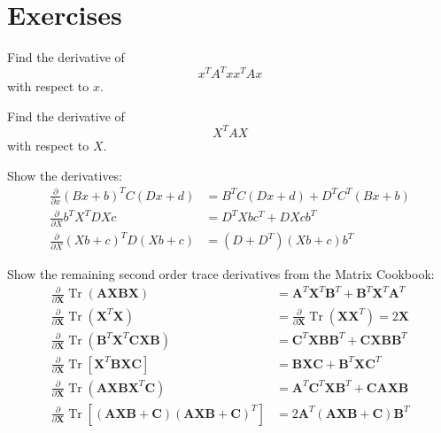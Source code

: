 \section{Exercises}
\begin{exercise}
   Find the derivative of \[x^T A^T x x^T A x\] with respect to $x$.
\end{exercise}

\begin{exercise}
   Find the derivative of \[X^T A X\] with respect to $X$.
\end{exercise}

\begin{exercise}
   Show the derivatives:
   \begin{align*}
   \tag{78}
   \frac{\partial}{\partial x} (Bx+b)^T C (Dx+d)
   &= B^TC(Dx+d) + D^TC^T(Bx+b)
   \\
   \tag{82}
   \frac{\partial}{\partial X} b^T X^T D X c
   &= D^T X b c^T + DXcb^T
   \\
   \tag{83}
   \frac{\partial}{\partial X} (Xb+c)^T D (Xb+c)
   &= (D+D^T)(Xb+c)b^T
   \end{align*}
\end{exercise}

\begin{exercise}
   Show the remaining second order trace derivatives from the Matrix Cookbook:
   \begin{align*}
   \frac{\partial}{\partial \mathbf{X}} \operatorname{Tr}(\mathbf{A X B X})
   &=\mathbf{A}^T \mathbf{X}^T \mathbf{B}^T+\mathbf{B}^T \mathbf{X}^T \mathbf{A}^T
   \\
   \frac{\partial}{\partial \mathbf{X}} \operatorname{Tr}\left(\mathbf{X}^T \mathbf{X}\right)
   &=\frac{\partial}{\partial \mathbf{X}} \operatorname{Tr}\left(\mathbf{X} \mathbf{X}^T\right)=2 \mathbf{X}
   \\
   \frac{\partial}{\partial \mathbf{X}} \operatorname{Tr}\left(\mathbf{B}^T \mathbf{X}^T \mathbf{C X B}\right)
   &=\mathbf{C}^T \mathbf{X} \mathbf{B B}^T+\mathbf{C X B B}^T
   \\
   \frac{\partial}{\partial \mathbf{X}} \operatorname{Tr}\left[\mathbf{X}^T \mathbf{B X C}\right]
   &=\mathbf{B X C}+\mathbf{B}^T \mathbf{X} \mathbf{C}^T
   \\
   \frac{\partial}{\partial \mathbf{X}} \operatorname{Tr}\left(\mathbf{A X B} \mathbf{X}^T \mathbf{C}\right)
   &=\mathbf{A}^T \mathbf{C}^T \mathbf{X B}^T+\mathbf{C A X B}
   \\
   \frac{\partial}{\partial \mathbf{X}} \operatorname{Tr}\left[(\mathbf{A X B}+\mathbf{C})(\mathbf{A X B}+\mathbf{C})^T\right]
   &=2 \mathbf{A}^T(\mathbf{A X B}+\mathbf{C}) \mathbf{B}^T
   \\
   \end{align*}
\end{exercise}

